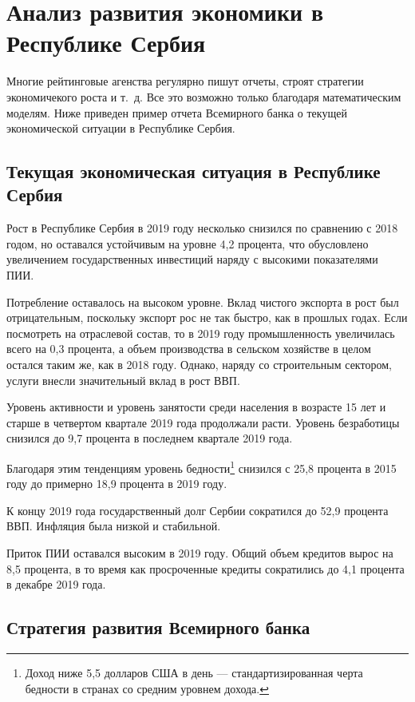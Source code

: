 \chapter{Анализ развития экономики в Республике Сербия}
\label{cha:analys}

Многие рейтинговые агенства регулярно пишут отчеты, строят стратегии экономичекого роста и т.~д.
Все это возможно только благодаря математическим моделям.
Ниже приведен пример отчета Всемирного банка о текущей экономической ситуации в Республике Сербия.

\section{Текущая экономическая ситуация в Республике Сербия}

Рост в Республике Сербия в 2019 году несколько снизился по сравнению с 2018 годом, но оставался устойчивым на уровне 4,2 процента, что обусловлено увеличением государственных инвестиций наряду с высокими показателями ПИИ.

Потребление оставалось на высоком уровне.
Вклад чистого экспорта в рост был отрицательным, поскольку экспорт рос не так быстро, как в прошлых годах.
Если посмотреть на отраслевой состав, то в 2019 году промышленность увеличилась всего на 0,3 процента, а объем производства в сельском хозяйстве в целом остался таким же, как в 2018 году.
Однако, наряду со строительным сектором, услуги внесли значительный вклад в рост ВВП.

Уровень активности и уровень занятости среди населения в возрасте 15 лет и старше в четвертом квартале 2019 года продолжали расти.
Уровень безработицы снизился до 9,7 процента в последнем квартале 2019 года.

Благодаря этим тенденциям уровень бедности\footnote{Доход ниже 5,5 долларов США в день --- стандартизированная черта бедности в странах со средним уровнем дохода.} снизился с 25,8 процента в 2015 году до примерно 18,9 процента в 2019 году.

К концу 2019 года государственный долг Сербии сократился до 52,9 процента ВВП.
Инфляция была низкой и стабильной.

Приток ПИИ оставался высоким в 2019 году.
Общий объем кредитов вырос на 8,5 процента, в то время как просроченные кредиты сократились до 4,1 процента в декабре 2019 года.

\section{Стратегия развития Всемирного банка}

